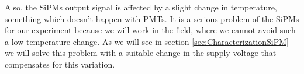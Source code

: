Also, the SiPMs output signal is affected by a slight change in temperature, something which doesn't happen with PMTs. It is a serious problem of the SiPMs for our experiment because we will work in the field, where we cannot avoid such a low temperature change. As we will see in section \ref{sec:CharacterizationSiPM} we will solve this problem with a suitable change in the supply voltage that compensates for this variation.